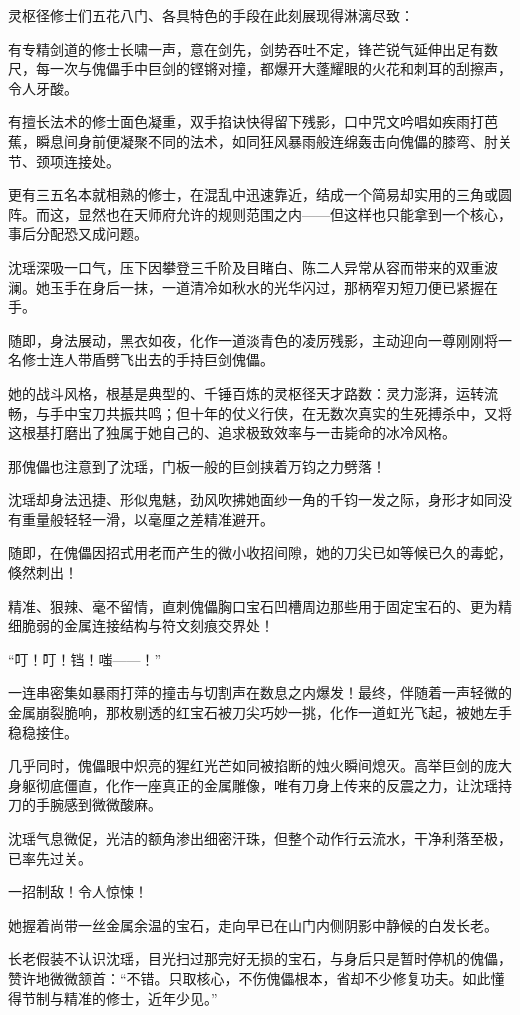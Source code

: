 灵枢径修士们五花八门、各具特色的手段在此刻展现得淋漓尽致：

有专精剑道的修士长啸一声，意在剑先，剑势吞吐不定，锋芒锐气延伸出足有数尺，每一次与傀儡手中巨剑的铿锵对撞，都爆开大蓬耀眼的火花和刺耳的刮擦声，令人牙酸。

有擅长法术的修士面色凝重，双手掐诀快得留下残影，口中咒文吟唱如疾雨打芭蕉，瞬息间身前便凝聚不同的法术，如同狂风暴雨般连绵轰击向傀儡的膝弯、肘关节、颈项连接处。

更有三五名本就相熟的修士，在混乱中迅速靠近，结成一个简易却实用的三角或圆阵。而这，显然也在天师府允许的规则范围之内——但这样也只能拿到一个核心，事后分配恐又成问题。

沈瑶深吸一口气，压下因攀登三千阶及目睹白、陈二人异常从容而带来的双重波澜。她玉手在身后一抹，一道清冷如秋水的光华闪过，那柄窄刃短刀便已紧握在手。

随即，身法展动，黑衣如夜，化作一道淡青色的凌厉残影，主动迎向一尊刚刚将一名修士连人带盾劈飞出去的手持巨剑傀儡。

她的战斗风格，根基是典型的、千锤百炼的灵枢径天才路数：灵力澎湃，运转流畅，与手中宝刀共振共鸣；但十年的仗义行侠，在无数次真实的生死搏杀中，又将这根基打磨出了独属于她自己的、追求极致效率与一击毙命的冰冷风格。

那傀儡也注意到了沈瑶，门板一般的巨剑挟着万钧之力劈落！

沈瑶却身法迅捷、形似鬼魅，劲风吹拂她面纱一角的千钧一发之际，身形才如同没有重量般轻轻一滑，以毫厘之差精准避开。

随即，在傀儡因招式用老而产生的微小收招间隙，她的刀尖已如等候已久的毒蛇，倏然刺出！

精准、狠辣、毫不留情，直刺傀儡胸口宝石凹槽周边那些用于固定宝石的、更为精细脆弱的金属连接结构与符文刻痕交界处！

“叮！叮！铛！嗤——！”

一连串密集如暴雨打萍的撞击与切割声在数息之内爆发！最终，伴随着一声轻微的金属崩裂脆响，那枚剔透的红宝石被刀尖巧妙一挑，化作一道虹光飞起，被她左手稳稳接住。

几乎同时，傀儡眼中炽亮的猩红光芒如同被掐断的烛火瞬间熄灭。高举巨剑的庞大身躯彻底僵直，化作一座真正的金属雕像，唯有刀身上传来的反震之力，让沈瑶持刀的手腕感到微微酸麻。

沈瑶气息微促，光洁的额角渗出细密汗珠，但整个动作行云流水，干净利落至极，已率先过关。

一招制敌！令人惊悚！

她握着尚带一丝金属余温的宝石，走向早已在山门内侧阴影中静候的白发长老。

长老假装不认识沈瑶，目光扫过那完好无损的宝石，与身后只是暂时停机的傀儡，赞许地微微颔首：“不错。只取核心，不伤傀儡根本，省却不少修复功夫。如此懂得节制与精准的修士，近年少见。”

